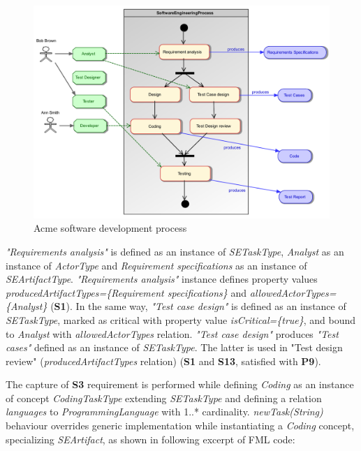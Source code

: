 \begin{figure}
 \centering
    \includegraphics[width=1.0 \columnwidth]{Figures/SoftwareEngineeringProcessCroped.pdf}
     \caption{Acme software development process}
    \label{fig:AcmeSoftwareDevelopmentProcess}
\end{figure}


\textit{"Requirements analysis"} is defined as an instance of \textit{SETaskType}, \textit{Analyst} as an instance of \textit{ActorType} and \textit{Requirement specifications} as an instance of \textit{SEArtifactType}. \textit{"Requirements analysis"} instance defines property values \textit{producedArtifactTypes=\{Requirement specifications\}} and \textit{allowedActorTypes=\{Analyst\}} (\textbf{S1}). In the same way, \textit{"Test case design"} is defined as an instance of \textit{SETaskType}, marked as critical with property value \textit{isCritical=\{true\}}, and bound to \textit{Analyst} with \textit{allowedActorTypes} relation. \textit{"Test case design"} produces \textit{"Test cases"} defined as an instance of \textit{SETaskType}. The latter is used in "Test design review" (\textit{producedArtifactTypes} relation) (\textbf{S1} and \textbf{S13}, satisfied with \textbf{P9}). 

The capture of \textbf{S3} requirement is performed while defining \textit{Coding} as an instance of concept \textit{CodingTaskType} extending \textit{SETaskType} and defining a relation \textit{languages} to \textit{ProgrammingLanguage} with 1..* cardinality. \textit{newTask(String)} behaviour overrides generic implementation while instantiating a \textit{Coding} concept, specializing \textit{SEArtifact}, as shown in following excerpt of FML code:

